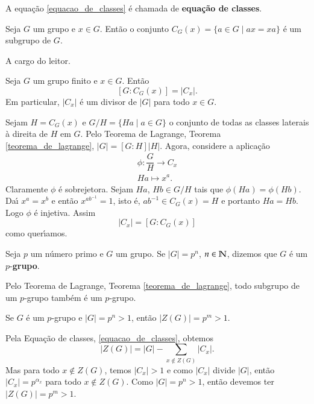 A equa\c{c}\~ao \eqref{equacao_de_classes} \'e chamada de \textbf{equa\c{c}\~ao de classes}.

\begin{proposicao}
	Seja $G$ um grupo e $x \in G$. Ent\~ao o conjunto $C_G(x) = \{a \in G \mid ax = xa\}$ \'e um subgrupo de $G$.
\end{proposicao}
\begin{prova}
	A cargo do leitor.
\end{prova}

\begin{proposicao}\label{ordem_da_classe_de_conjugacao}
	Seja $G$ um grupo finito e $x \in G$. Ent\~ao
	\[
		[G : C_G(x)] = |C_x|.
	\]
	Em particular, $|C_x|$ \'e um divisor de $|G|$ para todo $x \in G$.
\end{proposicao}
\begin{prova}
	Sejam $H = C_G(x)$ e $G/H = \{Ha \mid a \in G\}$ o conjunto de todas as classes laterais \`a direita de $H$ em $G$. Pelo Teorema de Lagrange, Teorema \ref{teorema_de_lagrange}, $|G| = [G : H]|H|$. Agora, considere a aplica\c{c}\~ao
	\begin{align*}
		\phi : \dfrac{G}{H} \to C_x\\
		Ha \mapsto x^a.
	\end{align*}
	Claramente $\phi$ \'e sobrejetora. Sejam $Ha$, $Hb \in G/H$ tais que $\phi(Ha) = \phi(Hb)$. Da{\'\i} $x^a = x^b$ e ent\~ao $x^{ab^{-1}} = 1$, isto \'e, $ab^{-1} \in C_G(x) = H$ e portanto $Ha = Hb$. Logo $\phi$ \'e injetiva. Assim
	\[
		|C_x| = [G : C_G(x)]
	\]
	como quer{\'\i}amos.
\end{prova}

\begin{definicao}
	Seja $p$ um n\'umero primo e $G$ um grupo. Se $|G| = p^n$, $n \in \mathbb{N}$, dizemos que $G$ \'e um $p$-\textbf{grupo}.
\end{definicao}

\begin{observacao}
	Pelo Teorema de Lagrange, Teorema \ref{teorema_de_lagrange}, todo subgrupo de um $p$-grupo tamb\'em \'e um $p$-grupo.
\end{observacao}

\begin{teorema}
	Se $G$ \'e um $p$-grupo e $|G| = p^n > 1$, ent\~ao $|Z(G)| = p^m > 1$.
\end{teorema}
\begin{prova}
	Pela Equa\c{c}\~ao de classes, \eqref{equacao_de_classes}, obtemos
	\[
		|Z(G)| = |G| - \sum_{x \notin Z(G)}|C_x|.
	\]
	Mas para todo $x \notin Z(G)$, temos $|C_x| > 1$ e como $|C_x|$ divide $|G|$, ent\~ao $|C_x| = p^{\alpha_x}$ para todo $x \notin Z(G)$. Como $|G| = p^n > 1$, ent\~ao devemos ter $|Z(G)| = p^m > 1$.
\end{prova}

